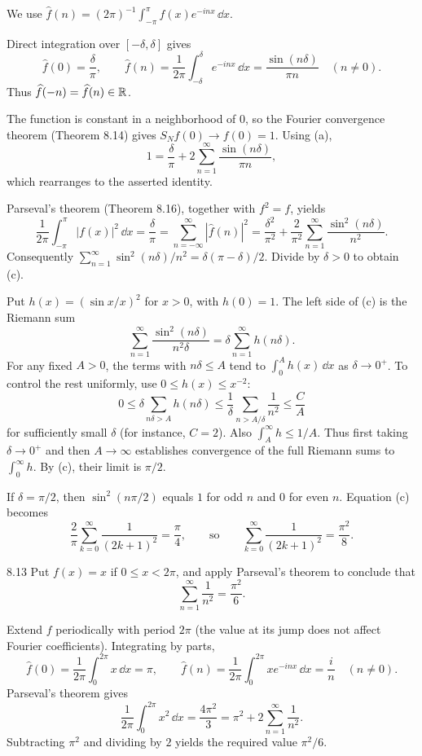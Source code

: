 \documentclass[11pt, oneside]{article}
\begin{document}
\begin{solution}
We use $\widehat f(n)=(2\pi)^{-1}\int_{-\pi}^{\pi}f(x)e^{-inx}\,\dd x$.
\begin{exercisesubparts}
\item Direct integration over $[-\delta, \delta]$ gives
\[
 \widehat f(0)=\frac\delta\pi, \qquad
 \widehat f(n)=\frac1{2\pi}\int_{-\delta}^\delta e^{-inx}\,\dd x
 =\frac{\sin(n\delta)}{\pi n}\quad(n\ne0).
\]
Thus $\widehat f(-n)=\widehat f(n)\in\mathbb{R}$.
\item The function is constant in a neighborhood of $0$, so the Fourier convergence theorem (Theorem 8.14) gives $S_N f(0)\to f(0)=1$. Using (a),
\[
 1=\frac\delta\pi+2\sum_{n=1}^\infty\frac{\sin(n\delta)}{\pi n},
\]
which rearranges to the asserted identity. 
\item Parseval's theorem (Theorem 8.16), together with $f^2=f$, yields
\[
 \frac1{2\pi}\int_{-\pi}^\pi |f(x)|^2\,\dd x
 =\frac\delta\pi
 =\sum_{n=-\infty}^\infty|\widehat f(n)|^2
 =\frac{\delta^2}{\pi^2}+\frac2{\pi^2}\sum_{n=1}^\infty\frac{\sin^2(n\delta)}{n^2}.
\]
Consequently $\sum_{n=1}^\infty\sin^2(n\delta)/n^2=\delta(\pi-\delta)/2$. Divide by $\delta>0$ to obtain (c).
\item Put $h(x)=(\sin x/x)^2$ for $x>0$, with $h(0)=1$. The left side of (c) is the Riemann sum
\[
 \sum_{n=1}^\infty\frac{\sin^2(n\delta)}{n^2\delta}
 =\delta\sum_{n=1}^\infty h(n\delta).
\]
For any fixed $A>0$, the terms with $n\delta\le A$ tend to $\int_0^A h(x)\,\dd x$ as $\delta\to0^+$. To control the rest uniformly, use $0\le h(x)\le x^{-2}$:
\[
 0\le\delta\sum_{n\delta>A}h(n\delta)
 \le\frac1\delta\sum_{n>A/\delta}\frac1{n^2}
 \le\frac{C}{A}
\]
for sufficiently small $\delta$ (for instance, $C=2$). Also $\int_A^\infty h\le1/A$. Thus first taking $\delta\to0^+$ and then $A\to\infty$ establishes convergence of the full Riemann sums to $\int_0^\infty h$. By (c), their limit is $\pi/2$.
\item If $\delta=\pi/2$, then $\sin^2(n\pi/2)$ equals $1$ for odd $n$ and $0$ for even $n$. Equation (c) becomes
\[
 \frac2\pi\sum_{k=0}^\infty\frac1{(2k+1)^2}=\frac\pi4,
 \qquad\text{so}\qquad
 \sum_{k=0}^\infty\frac1{(2k+1)^2}=\frac{\pi^2}{8}.
\]
\end{exercisesubparts}
\end{solution}

\begin{exercise}{8.13}
Put $f(x)=x$ if $0\le x<2\pi$, and apply Parseval's theorem to conclude that
\[
 \sum_{n=1}^\infty\frac1{n^2}=\frac{\pi^2}{6}.
\]
\end{exercise}
\begin{solution}
Extend $f$ periodically with period $2\pi$ (the value at its jump does not affect Fourier coefficients). Integrating by parts,
\[
 \widehat f(0)=\frac1{2\pi}\int_0^{2\pi}x\,\dd x=\pi,
 \qquad \widehat f(n)=\frac1{2\pi}\int_0^{2\pi}xe^{-inx}\,\dd x=\frac{i}{n}\quad(n\ne0).
\]
Parseval's theorem gives
\[
 \frac1{2\pi}\int_0^{2\pi}x^2\,\dd x
 =\frac{4\pi^2}{3}
 =\pi^2+2\sum_{n=1}^\infty\frac1{n^2}.
\]
Subtracting $\pi^2$ and dividing by $2$ yields the required value $\pi^2/6$.
\end{solution}
\end{document}
